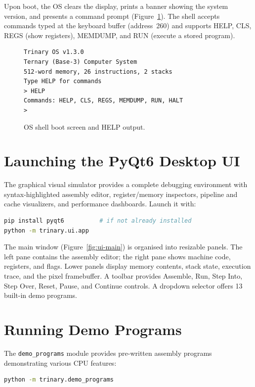 Upon boot, the OS clears the display, prints a banner showing the system version, and presents a command prompt (Figure~\ref{fig:os-boot}). The shell accepts commands typed at the keyboard buffer (address~260) and supports HELP, CLS, REGS (show registers), MEMDUMP, and RUN (execute a stored program).

\begin{figure}[h]
\centering
\begin{lstlisting}[basicstyle=\ttfamily\tiny]
Trinary OS v1.3.0
Ternary (Base-3) Computer System
512-word memory, 26 instructions, 2 stacks
Type HELP for commands
> HELP
Commands: HELP, CLS, REGS, MEMDUMP, RUN, HALT
>
\end{lstlisting}
\caption{OS shell boot screen and HELP output.}
\label{fig:os-boot}
\end{figure}

\section{Launching the PyQt6 Desktop UI}

The graphical visual simulator provides a complete debugging environment with syntax-highlighted assembly editor, register/memory inspectors, pipeline and cache visualizers, and performance dashboards. Launch it with:

\begin{lstlisting}[language=bash, caption={Launching the PyQt6 desktop UI}, label={lst:ui}]
pip install pyqt6          # if not already installed
python -m trinary.ui.app
\end{lstlisting}

The main window (Figure~\ref{fig:ui-main}) is organised into resizable panels. The left pane contains the assembly editor; the right pane shows machine code, registers, and flags. Lower panels display memory contents, stack state, execution trace, and the pixel framebuffer. A toolbar provides Assemble, Run, Step Into, Step Over, Reset, Pause, and Continue controls. A dropdown selector offers 13 built-in demo programs.

\section{Running Demo Programs}

The \texttt{demo\_programs} module provides pre-written assembly programs demonstrating various CPU features:

\begin{lstlisting}[language=bash, caption={Running demo programs}, label={lst:demos}]
python -m trinary.demo_programs
\end{lstlisting}

